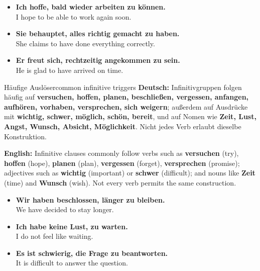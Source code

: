 \documentclass[a4paper,11pt]{article}
\newcommand{\GermanText}[1]{\textbf{Deutsch: }#1\par}
\newcommand{\EnglishText}[1]{{\small\color{SoftGray}\textbf{English: }#1\par}}
\newcommand{\ExampleItem}[2]{\item \textbf{#1}\\{\small\color{SoftGray}#2}}
\begin{document}
\begin{exbox}
\begin{itemize}
\ExampleItem{Ich hoffe, bald wieder arbeiten zu können.}{I hope to be able to work again soon.}
\ExampleItem{Sie behauptet, alles richtig gemacht zu haben.}{She claims to have done everything correctly.}
\ExampleItem{Er freut sich, rechtzeitig angekommen zu sein.}{He is glad to have arrived on time.}
\end{itemize}
\end{exbox}
\begin{grammarentry}{Häufige Auslöser}{common infinitive triggers}
\GermanText{Infinitivgruppen folgen häufig auf \textbf{versuchen, hoffen, planen, beschließen, vergessen, anfangen, aufhören, vorhaben, versprechen, sich weigern}; außerdem auf Ausdrücke mit \textbf{wichtig, schwer, möglich, schön, bereit}, und auf Nomen wie \textbf{Zeit, Lust, Angst, Wunsch, Absicht, Möglichkeit}. Nicht jedes Verb erlaubt dieselbe Konstruktion.}
\EnglishText{Infinitive clauses commonly follow verbs such as \textbf{versuchen} (try), \textbf{hoffen} (hope), \textbf{planen} (plan), \textbf{vergessen} (forget), \textbf{versprechen} (promise); adjectives such as \textbf{wichtig} (important) or \textbf{schwer} (difficult); and nouns like \textbf{Zeit} (time) and \textbf{Wunsch} (wish). Not every verb permits the same construction.}
\end{grammarentry}
\begin{exbox}
\begin{itemize}
\ExampleItem{Wir haben beschlossen, länger zu bleiben.}{We have decided to stay longer.}
\ExampleItem{Ich habe keine Lust, zu warten.}{I do not feel like waiting.}
\ExampleItem{Es ist schwierig, die Frage zu beantworten.}{It is difficult to answer the question.}
\end{itemize}
\end{exbox}
\end{document}
